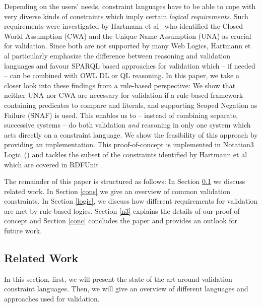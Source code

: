 Depending on the users' needs, constraint languages have to be able to cope with very diverse kinds of constraints which 
imply certain \emph{logical requirements}.
Such requirements were investigated by Hartmann et al~\cite{bosch2015} who
identified the Closed World Assumption (CWA) and the Unique Name Assumption (UNA) as crucial for validation. Since both are not 
supported by many Web Logics, Hartmann et al
 particularly emphasize
the difference between reasoning and validation languages
and favour SPARQL based approaches for validation
which -- if needed -- can be combined with OWL DL or QL reasoning.
In this paper, we take a closer look into these findings from a rule-based perspective:  
We show that neither UNA nor CWA are necessary for validation if a rule-based framework containing predicates 
to compare \uris and literals, and supporting
Scoped Negation as Failure (SNAF) is used. This enables us to --
instead of combining separate, successive systems --
do both \rdf validation \emph{and} reasoning in only one system which acts directly on a constraint language. 
We show the feasibility of this approach by providing an
implementation. 
This proof-of-concept is implemented in Notation3 Logic~(\nthreelogic)
and tackles the subset of the constraints
identified by Hartmann et al~\cite{bosch2015} 
which are covered in RDFUnit \cite{kontokostas2014test}.

The remainder of this paper is structured as follows:
In Section \ref{rw} we discuss related work.
In Section \ref{cons} we give an overview of common \rdf validation constraints.
In Section \ref{logic}, we discuss
how different requirements for \rdf validation are met by rule-based logics.
Section \ref{n3} explains the details of our proof of concept
and Section \ref{conc} concludes the paper and provides an outlook 
for future work.




\subsection{Related Work}\label{rw}

In this section, first,
we will present the state of the art around validation constraint languages.
Then, we will give an overview
of different languages and approaches used for \rdf validation.


